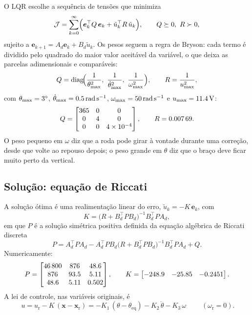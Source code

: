\documentclass[11pt,a4paper]{article}
\newcommand{\vt}[1]{\bm{#1}}
\newcommand{\xref}{\vt{x}_{\mathrm{r}}}
\begin{document}
O LQR escolhe a sequência de tensões que minimiza
\begin{equation}
  \mathcal{J} = \sum_{k=0}^{\infty} \Bigl( \vt{e}_k^{\top} Q\, \vt{e}_k + \tilde u_k^{\top} R\, \tilde u_k \Bigr),
  \qquad Q \succeq 0,\ R \succ 0 ,
\end{equation}
sujeito a $\vt{e}_{k+1} = A_d\vt{e}_k + B_d\tilde u_k$. Os pesos seguem a regra de Bryson: cada
termo é dividido pelo quadrado do maior valor aceitável da variável, o que deixa as parcelas
adimensionais e comparáveis:
\begin{equation}
  Q = \operatorname{diag}\!\Bigl(\frac{1}{\theta_{\max}^2},\ \frac{1}{\dot\theta_{\max}^2},\ \frac{1}{\omega_{\max}^2}\Bigr),
  \qquad
  R = \frac{1}{u_{\max}^2},
\end{equation}
com $\theta_{\max} = \qty{3}{\degree}$, $\dot\theta_{\max} = \qty{0.5}{\radian\per\second}$,
$\omega_{\max} = \qty{50}{\radian\per\second}$ e $u_{\max} = \qty{11.4}{\volt}$:
\begin{equation}
  Q = \begin{bmatrix} \num{365} & \num{0} & \num{0} \\ \num{0} & \num{4} & \num{0} \\ \num{0} & \num{0} & \num{4e-4} \end{bmatrix} ,
  \qquad
  R = \num{0.00769} .
\end{equation}
O peso pequeno em $\omega$ diz que a roda pode girar à vontade durante uma correção, desde que
volte ao repouso depois; o peso grande em $\theta$ diz que o braço deve ficar muito perto da vertical.

\subsection{Solução: equação de Riccati}

A solução ótima é uma realimentação linear do erro, $\tilde u_k = -K\,\vt{e}_k$, com
\begin{equation}
  K = \bigl(R + B_d^{\top} P B_d\bigr)^{-1} B_d^{\top} P A_d ,
\end{equation}
em que $P$ é a solução simétrica positiva definida da equação algébrica de Riccati discreta
\begin{equation}
  P = A_d^{\top} P A_d - A_d^{\top} P B_d \bigl(R + B_d^{\top} P B_d\bigr)^{-1} B_d^{\top} P A_d + Q .
\end{equation}
Numericamente:
\begin{equation}
  P = \begin{bmatrix} \num{46800} & \num{876} & \num{48.6} \\ \num{876} & \num{93.5} & \num{5.11} \\ \num{48.6} & \num{5.11} & \num{0.502} \end{bmatrix} ,
  \qquad
  K = \begin{bmatrix} \num{-248.9} & \num{-25.85} & \num{-0.2451} \end{bmatrix} .
\end{equation}
A lei de controle, nas variáveis originais, é
\begin{equation}
  \boxed{\;u = u_{\mathrm{r}} - K\,(\vt{x} - \xref)
  = -K_1\,(\theta - \theta_{\mathrm{eq}}) - K_2\,\dot\theta - K_3\,\omega\;}
  \qquad (\omega_{\mathrm{r}} = 0).
\end{equation}
\end{document}
